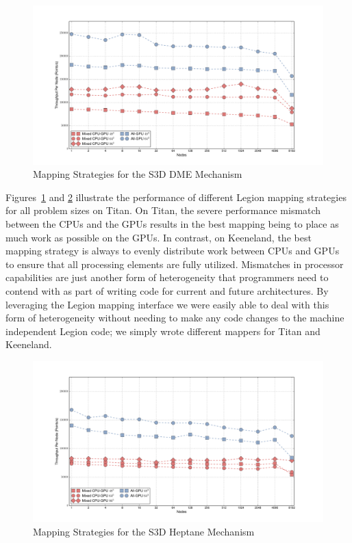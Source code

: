 \begin{figure}
\centering
\includegraphics[scale=0.4]{figs/legion_dme_titan.pdf}
\caption{Mapping Strategies for the S3D DME Mechanism\label{fig:dmemap}}
\end{figure}

Figures~\ref{fig:dmemap} and \ref{fig:heptmap} 
illustrate the performance of different 
Legion mapping strategies for all problem sizes on Titan.
On Titan, the severe performance mismatch between the CPUs 
and the GPUs results in the best mapping being to place as
much work as possible on the GPUs. In contrast, on Keeneland,
the best mapping strategy is always to evenly distribute work
between CPUs and GPUs to ensure that all processing elements
are fully utilized. Mismatches in processor capabilities are
just another form of heterogeneity that programmers need to
contend with as part of writing code for current and future
architectures. By leveraging the Legion mapping interface
we were easily able to deal with this form of heterogeneity
without needing to make any code changes to the machine
independent Legion code; we simply wrote different 
mappers for Titan and Keeneland.

\begin{figure}
\centering
\includegraphics[scale=0.4]{figs/legion_hept_titan.pdf}
\caption{Mapping Strategies for the S3D Heptane Mechanism\label{fig:heptmap}}
\end{figure}


